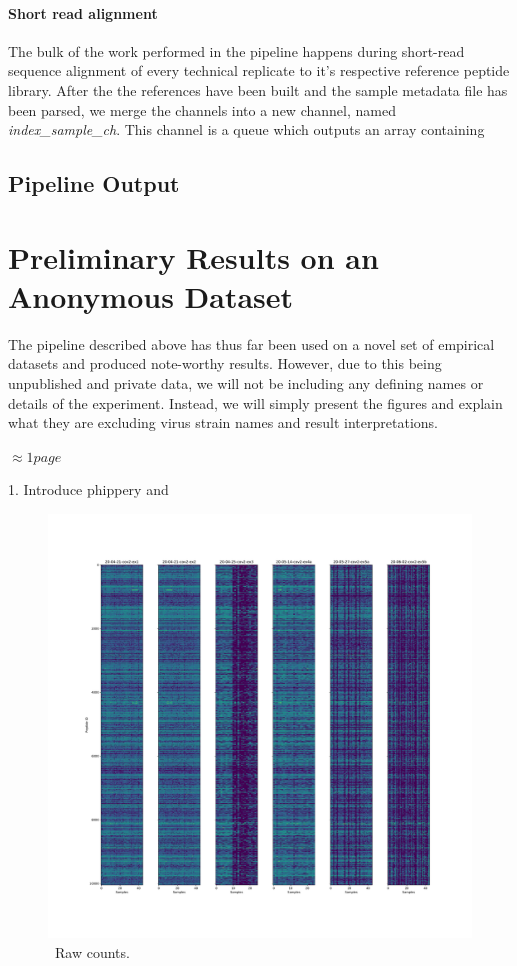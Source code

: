\documentclass{article}
\begin{document}
\paragraph{Short read alignment}
The bulk of the work performed in the pipeline happens during short-read sequence alignment of every technical replicate to it's respective reference peptide library.
After the the references have been built and the sample metadata file has been parsed, we merge the channels into a new channel, named \textit{index\_sample\_ch}.
This channel is a queue which outputs an array containing 

\subsection*{Pipeline Output}



\section*{Preliminary Results on an Anonymous Dataset}

The pipeline described above has thus far been used on a novel set of empirical datasets and produced note-worthy results.
However, due to this being unpublished and private data, we will not be including any defining names or details of the experiment.
Instead, we will simply present the figures and explain what they are excluding virus strain names and result interpretations.

$\approx 1 page$

1. Introduce phippery and 

\begin{figure}[h!!!!]
\centering
\includegraphics[width=1.0\textwidth]{figures/raw_counts.pdf}
\caption{ \
Raw counts.
}
\label{fig:raw_counts}
\end{figure}
\end{document}
